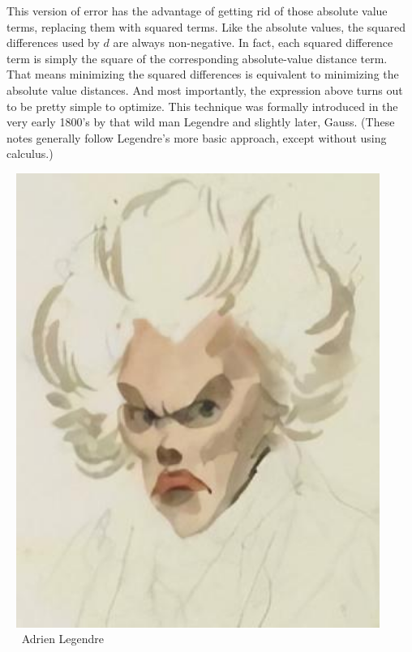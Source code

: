 \documentclass[10pt]{article}
\begin{document}
\begin{minipage}[c]{0.6\textwidth}
\vspace{-20pt}
This version of error has the advantage of getting rid of those absolute value
terms, replacing them with squared terms.  Like the absolute values, the
squared differences used by $d$ are always non-negative. In fact, each squared
difference term is simply the square of the corresponding absolute-value
distance term.  That means minimizing the squared differences is equivalent to
minimizing the  absolute value distances.  And most importantly, the
expression above turns out to be pretty simple to optimize.
This technique was formally introduced in the very early 1800's by that
wild man Legendre\cite{leg} and slightly later, Gauss\cite{gauss,st}.
(These notes generally follow Legendre's more basic approach, except
without using calculus.)
\end{minipage}
\begin{minipage}[c]{0.2\textwidth}
$\phantom{0}\,\,$\includegraphics[width=0.89\textwidth]{Legendre}\\
$\phantom{00}\,\,$Adrien Legendre\\[12pt]
\end{minipage}
\end{document}
